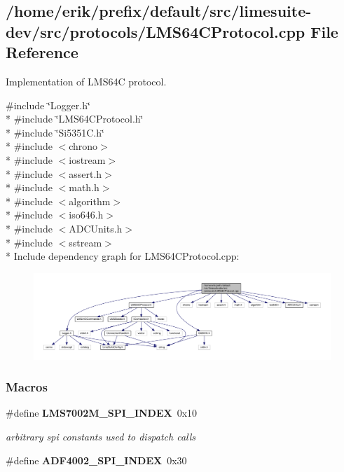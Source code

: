 \subsection{/home/erik/prefix/default/src/limesuite-\/dev/src/protocols/\+L\+M\+S64\+C\+Protocol.cpp File Reference}
\label{LMS64CProtocol_8cpp}


Implementation of L\+M\+S64C protocol.  


{\ttfamily \#include \char`\"{}Logger.\+h\char`\"{}}\\*
{\ttfamily \#include \char`\"{}L\+M\+S64\+C\+Protocol.\+h\char`\"{}}\\*
{\ttfamily \#include \char`\"{}Si5351\+C.\+h\char`\"{}}\\*
{\ttfamily \#include $<$chrono$>$}\\*
{\ttfamily \#include $<$iostream$>$}\\*
{\ttfamily \#include $<$assert.\+h$>$}\\*
{\ttfamily \#include $<$math.\+h$>$}\\*
{\ttfamily \#include $<$algorithm$>$}\\*
{\ttfamily \#include $<$iso646.\+h$>$}\\*
{\ttfamily \#include $<$A\+D\+C\+Units.\+h$>$}\\*
{\ttfamily \#include $<$sstream$>$}\\*
Include dependency graph for L\+M\+S64\+C\+Protocol.\+cpp\+:
\nopagebreak
\begin{figure}[H]
\begin{center}
\leavevmode
\includegraphics[width=350pt]{df/d69/LMS64CProtocol_8cpp__incl}
\end{center}
\end{figure}
\subsubsection*{Macros}
\begin{DoxyCompactItemize}
\item 
\#define {\bf L\+M\+S7002\+M\+\_\+\+S\+P\+I\+\_\+\+I\+N\+D\+EX}~0x10
\begin{DoxyCompactList}\small\item\em arbitrary spi constants used to dispatch calls \end{DoxyCompactList}\item 
\#define {\bf A\+D\+F4002\+\_\+\+S\+P\+I\+\_\+\+I\+N\+D\+EX}~0x30
\end{DoxyCompactItemize}
